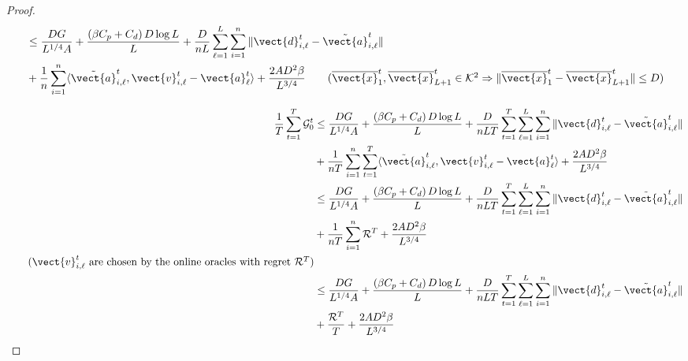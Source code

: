 \begin{proof}
\begin{align*}
        &\leq \frac{DG}{L^{1/4}A} + \frac{\left(\beta C_p + C_d\right)D \log L }{L} + \frac{D}{nL} \sum_{\ell=1}^{L} \sum_{i=1}^{n} \| \vect{d}^t_{i,\ell} - \Tilde{\vect{a}}^{t}_{i, \ell} \| \\
        &+  \frac{1}{n}\sum_{i=1}^{n}\langle \Tilde{\vect{a}}^{t}_{i, \ell}, \vect{v}^t_{i,\ell} - \vect{a}^{t}_{\ell} \rangle + \frac{2AD^2\beta}{L^{3/4}}
        \tag{$\overline{\vect{x}}^t_{1}, \overline{\vect{x}}^t_{L+1} \in \mathcal{K}^2 \Rightarrow \| \overline{\vect{x}}^t_{1} -  \overline{\vect{x}}^t_{L+1} \| \leq D$}\\
\end{align*}

\begin{align*}
    \frac{1}{T}\sum_{t=1}^{T} \mathcal{G}_0^t  
    &\leq \frac{DG}{L^{1/4}A} + \frac{\left(\beta C_p + C_d\right)D \log L }{L} + \frac{D}{nLT} \sum_{t=1}^{T} \sum_{\ell=1}^{L} \sum_{i=1}^{n} \| \vect{d}^t_{i,\ell} - \Tilde{\vect{a}}^{t}_{i, \ell} \| \\
    &+  \frac{1}{nT} \sum_{i=1}^{n} \sum_{t=1}^{T}\langle \Tilde{\vect{a}}^{t}_{i, \ell}, \vect{v}^t_{i,\ell} - \vect{a}^{t}_{\ell} \rangle + \frac{2AD^2\beta}{L^{3/4}}\\
    &\leq \frac{DG}{L^{1/4}A} +\frac{\left(\beta C_p + C_d\right)D \log L }{L} + \frac{D}{nLT} \sum_{t=1}^{T} \sum_{\ell=1}^{L} \sum_{i=1}^{n} \| \vect{d}^t_{i,\ell} - \Tilde{\vect{a}}^{t}_{i, \ell} \| \\
    &+  \frac{1}{nT} \sum_{i=1}^{n} \mathcal{R}^T + \frac{2AD^2\beta}{L^{3/4}}\\
    \tag{$\vect{v}^t_{i,\ell}$ are chosen by the online oracles with regret $\mathcal{R}^T$} 
    \\
    &\leq \frac{DG}{L^{1/4}A} + \frac{\left(\beta C_p + C_d\right)D \log L }{L} + \frac{D}{nLT} \sum_{t=1}^{T} \sum_{\ell=1}^{L} \sum_{i=1}^{n} \| \vect{d}^t_{i,\ell} - \Tilde{\vect{a}}^{t}_{i, \ell} \| \\
    &+ \frac{\mathcal{R}^T}{T} + \frac{2AD^2\beta}{L^{3/4}}
\end{align*}
     

\end{proof}
